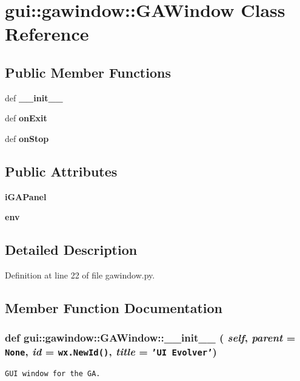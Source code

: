 \section{gui::gawindow::GAWindow Class Reference}
\label{classgui_1_1gawindow_1_1GAWindow}
\subsection*{Public Member Functions}
\begin{CompactItemize}
\item 
def {\bf \_\-\_\-init\_\-\_\-}
\item 
def {\bf onExit}
\item 
def {\bf onStop}
\end{CompactItemize}
\subsection*{Public Attributes}
\begin{CompactItemize}
\item 
{\bf iGAPanel}
\item 
{\bf env}
\end{CompactItemize}


\subsection{Detailed Description}


Definition at line 22 of file gawindow.py.

\subsection{Member Function Documentation}
\subsubsection{\setlength{\rightskip}{0pt plus 5cm}def gui::gawindow::GAWindow::\_\-\_\-init\_\-\_\- ( {\em self},  {\em parent} = {\tt None},  {\em id} = {\tt wx.NewId()},  {\em title} = {\tt 'UI~Evolver'})}\label{classgui_1_1gawindow_1_1GAWindow_2b818da972af0d5491e4984ee739ff6e}




\footnotesize\begin{verbatim}
GUI window for the GA.
\end{verbatim}
\normalsize
 

